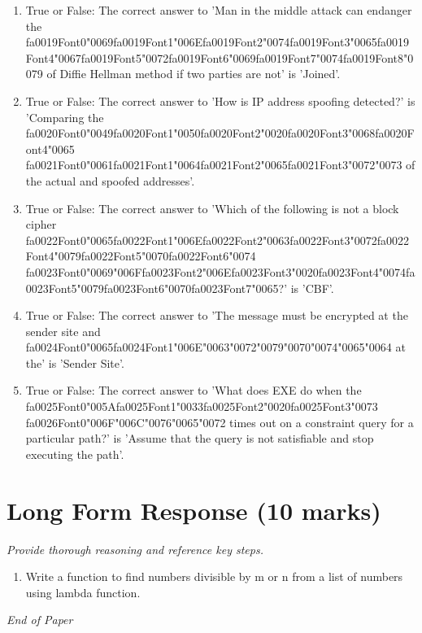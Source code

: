 \documentclass[12pt]{article}
\begin{document}
\begin{enumerate}[label=\arabic*.]
\item True or False: The correct answer to 'Man in the middle attack can endanger the {\csname fa0019Font0\endcsname\char"0069}{\csname fa0019Font1\endcsname\char"006E}{\csname fa0019Font2\endcsname\char"0074}{\csname fa0019Font3\endcsname\char"0065}{\csname fa0019Font4\endcsname\char"0067}{\csname fa0019Font5\endcsname\char"0072}{\csname fa0019Font6\endcsname\char"0069}{\csname fa0019Font7\endcsname\char"0074}{\csname fa0019Font8\endcsname\char"0079} of Diffie Hellman method if two parties are not' is 'Joined'.
\item True or False: The correct answer to 'How is IP address spoofing detected?' is 'Comparing the {\csname fa0020Font0\endcsname\char"0049}{\csname fa0020Font1\endcsname\char"0050}{\csname fa0020Font2\endcsname\char"0020}{\csname fa0020Font3\endcsname\char"0068}{\csname fa0020Font4\endcsname\char"0065} {\csname fa0021Font0\endcsname\char"0061}{\csname fa0021Font1\endcsname\char"0064}{\csname fa0021Font2\endcsname\char"0065}{\csname fa0021Font3\endcsname\char"0072}{\char"0073} of the actual and spoofed addresses'.
\item True or False: The correct answer to 'Which of the following is not a block cipher {\csname fa0022Font0\endcsname\char"0065}{\csname fa0022Font1\endcsname\char"006E}{\csname fa0022Font2\endcsname\char"0063}{\csname fa0022Font3\endcsname\char"0072}{\csname fa0022Font4\endcsname\char"0079}{\csname fa0022Font5\endcsname\char"0070}{\csname fa0022Font6\endcsname\char"0074} {\csname fa0023Font0\endcsname\char"0069}{\char"006F}{\csname fa0023Font2\endcsname\char"006E}{\csname fa0023Font3\endcsname\char"0020}{\csname fa0023Font4\endcsname\char"0074}{\csname fa0023Font5\endcsname\char"0079}{\csname fa0023Font6\endcsname\char"0070}{\csname fa0023Font7\endcsname\char"0065}?' is 'CBF'.
\item True or False: The correct answer to 'The message must be encrypted at the sender site and {\csname fa0024Font0\endcsname\char"0065}{\csname fa0024Font1\endcsname\char"006E}{\char"0063}{\char"0072}{\char"0079}{\char"0070}{\char"0074}{\char"0065}{\char"0064} at the' is 'Sender Site'.
\item True or False: The correct answer to 'What does EXE do when the {\csname fa0025Font0\endcsname\char"005A}{\csname fa0025Font1\endcsname\char"0033}{\csname fa0025Font2\endcsname\char"0020}{\csname fa0025Font3\endcsname\char"0073} {\csname fa0026Font0\endcsname\char"006F}{\char"006C}{\char"0076}{\char"0065}{\char"0072} times out on a constraint query for a particular path?' is 'Assume that the query is not satisfiable and stop executing the path'.
\end{enumerate}

\section*{Long Form Response (10 marks)}
\textit{Provide thorough reasoning and reference key steps.}
\begin{enumerate}[label=\arabic*.]
\item Write a function to find numbers divisible by m or n from a list of numbers using lambda
function.
\end{enumerate}

\vfill
\noindent\textit{End of Paper}
\end{document}
